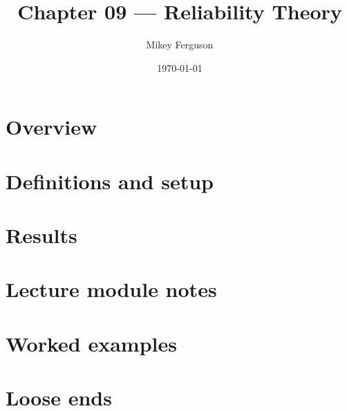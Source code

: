 \documentclass[11pt]{article}
\title{Chapter 09 --- Reliability Theory}
\author{Mikey Ferguson}
\date{\today}
\begin{document}
\maketitle
\tableofcontents
\bigskip

\section{Overview}

\section{Definitions and setup}

\section{Results}

\section{Lecture module notes}

\section{Worked examples}

\section{Loose ends}
\end{document}
